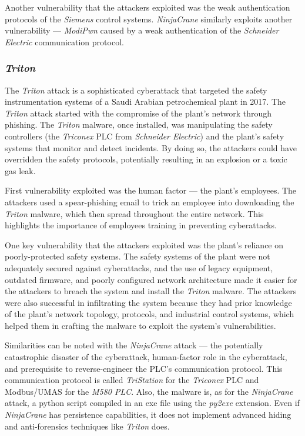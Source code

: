 Another vulnerability that the attackers exploited was the weak authentication protocols of the \emph{Siemens} control systems. \emph{NinjaCrane} similarly exploits another vulnerability — \emph{ModiPwn} caused by a weak authentication of the \emph{Schneider Electric} communication protocol.

\subsubsection{\emph{Triton}}

The \emph{Triton} attack is a sophisticated cyberattack that targeted the safety instrumentation systems of a Saudi Arabian petrochemical plant in 2017. The \emph{Triton} attack started with the compromise of the plant’s network through phishing. The \emph{Triton} malware, once installed, was manipulating the safety controllers (the \emph{Triconex} PLC from \emph{Schneider Electric}) and the plant’s safety systems that monitor and detect incidents. By doing so, the attackers could have overridden the safety protocols, potentially resulting in an explosion or a toxic gas leak.

First vulnerability exploited was the human factor — the plant’s employees. The attackers used a spear-phishing email to trick an employee into downloading the \emph{Triton} malware, which then spread throughout the entire network. This highlights the importance of employees training in preventing cyberattacks.

One key vulnerability that the attackers exploited was the plant’s reliance on poorly-protected safety systems. The safety systems of the plant were not adequately secured against cyberattacks, and the use of legacy equipment, outdated firmware, and poorly configured network architecture made it easier for the attackers to breach the system and install the \emph{Triton} malware. The attackers were also successful in infiltrating the system because they had prior knowledge of the plant’s network topology, protocols, and industrial control systems, which helped them in crafting the malware to exploit the system’s vulnerabilities.

Similarities can be noted with the \emph{NinjaCrane} attack — the potentially catastrophic disaster of the cyberattack, human-factor role in the cyberattack, and prerequisite to reverse-engineer the PLC's communication protocol. This communication protocol is called \emph{TriStation} for the \emph{Triconex} PLC and Modbus/UMAS for the \emph{M580 PLC}. Also, the malware is, as for the \emph{NinjaCrane} attack, a python script compiled in an exe file using the \emph{py2exe} extension. Even if \emph{NinjaCrane} has persistence capabilities, it does not implement advanced hiding and anti-forensics techniques like \emph{Triton} does.

